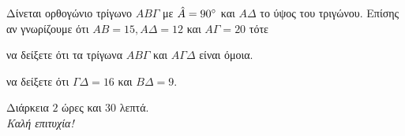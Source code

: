 \documentclass[twoside,nofonts,internet,math,spyros]{frontisthrio-diag}
\begin{document}
\begin{thema}
\begin{erwthma}
{
}{
\item Δίνεται ορθογώνιο τρίγωνο $ AB\varGamma $ με $ \hat{A}=90\degree $ και $ A\varDelta $ το ύψος του τριγώνου. Επίσης αν γνωρίζουμε ότι $ AB=15, A\varDelta=12 $ και $ A\varGamma=20 $ τότε
\begin{alist}
\item να δείξετε ότι τα τρίγωνα $ AB\varGamma $ και $ A\varGamma\varDelta $ είναι όμοια.
\item να δείξετε ότι $ \varGamma\varDelta=16 $ και $ B\varDelta=9 $.
\end{alist}}
\end{erwthma}
\end{thema}
\vfill
\begin{flushright}
Διάρκεια $ 2 $ ώρες και $ 30 $ λεπτά.\\
\textit{Καλή επιτυχία!}
\end{flushright}
\end{document}
